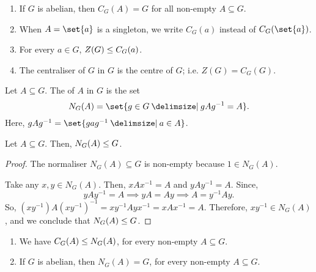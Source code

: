 \documentclass[11pt]{penrose}
\begin{document}
\begin{remark}\phantom{}
    \begin{enumerate}
        \item If $G$ is abelian, then $C_{G}(A) = G$ for all non-empty $A \subseteq G$.
        \item When $A = \set{a}$ is a singleton, we write $C_{G}(a)$ instead of $C_{G}(\set{a})$.
        \item For every $a \in G$, $Z(G) \mathrel{\leq} C_{G}(a)$.
        \item The centraliser of $G$ in $G$ is the centre of $G$; i.e. $Z(G) = C_{G}(G)$.
    \end{enumerate}
\end{remark}

\begin{ndfn}[Normaliser]
    Let $A \subseteq G$. The  of $A$ in $G$ is the set
    \begin{equation*}
        N_{G}(A) = \set{ g \in G \st g A g^{-1} = A}.
    \end{equation*}
    Here, $g A g^{-1} = \set{g a g^{-1} \st a \in A}$.
\end{ndfn}

\begin{nprop}
    Let $A \subseteq G$. Then, $N_{G}(A) \mathrel{\leq} G$.
\end{nprop}
\begin{proof}
    The normaliser $N_{G}(A) \subseteq G$ is non-empty because $1 \in N_{G}(A)$.

    Take any $x, y \in N_{G}(A)$. Then, $xAx^{-1} = A$ and $yAy^{-1} = A$. Since,
    \begin{equation*}
        yAy^{-1} = A
        \implies
        yA = Ay
        \implies
        A = y^{-1}Ay.
    \end{equation*}
    So, $(xy^{-1}) A (xy^{-1})^{-1} = x y^{-1} A y x^{-1} = x A x^{-1} = A$. Therefore, $xy^{-1} \in N_{G}(A)$, and we conclude that $N_{G}(A) \mathrel{\leq} G$.
\end{proof}

\begin{remark}
    \phantom{}
    \begin{enumerate}
        \item We have $C_{G}(A) \mathrel{\leq} N_{G}(A)$, for every non-empty $A \subseteq G$.
        \item If $G$ is abelian, then $N_{G}(A) = G$, for every non-empty $A \subseteq G$.
    \end{enumerate}
\end{remark}
\end{document}

